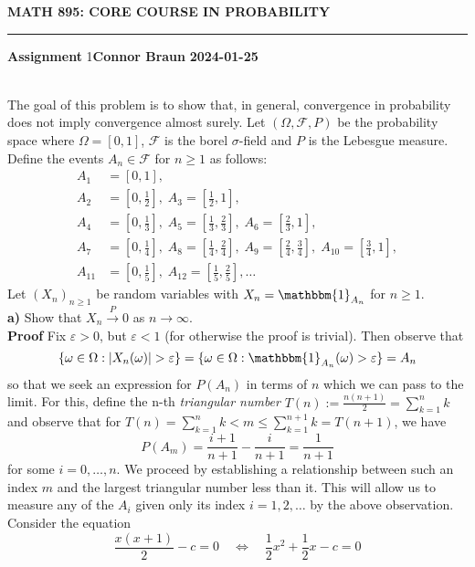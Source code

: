 \documentclass[10pt]{article}
\newcommand{\1}[1]{\mathbbm{1}_{#1}}
\begin{document}
    \begin{center}
        {\bf\large{MATH 895: CORE COURSE IN PROBABILITY}}
        \smallskip
        \hrule
        \smallskip
        {\bf Assignment} 1\hfill {\bf Connor Braun} \hfill {\bf 2024-01-25}
    \end{center}
    \\[5pt]
    The goal of this problem is to show that, in general, convergence in probability does not imply convergence almost surely. Let $(\Omega, \mathcal{F}, P)$ be the probability space where $\Omega=[0,1]$,
    $\mathcal{F}$ is the borel $\sigma$-field and $P$ is the Lebesgue measure. Define the events $A_n\in\mathcal{F}$ for $n\geq  1$ as follows:
    \begin{align*}
        A_1&=[0,1],\\
        A_2&=[0,\tfrac{1}{2}],\;A_3=[\tfrac{1}{2},1],\\
        A_4&=[0,\tfrac{1}{3}],\;A_5=[\tfrac{1}{3},\tfrac{2}{3}],\;A_6=[\tfrac{2}{3},1],\\
        A_7&=[0,\tfrac{1}{4}],\;A_8=[\tfrac{1}{4},\tfrac{2}{4}],\;A_9=[\tfrac{2}{4},\tfrac{3}{4}],\;A_{10}=[\tfrac{3}{4},1],\\
        A_{11}&=[0,\tfrac{1}{5}],\;A_{12}=[\tfrac{1}{5},\tfrac{2}{5}],\dots
    \end{align*}
    Let $(X_n)_{n\geq 1}$ be random variables with $X_n=\1{A_n}$ for $n\geq 1$.\\[5pt]
    {\bf a)} Show that $X_n\overset{P}{\longrightarrow} 0$ as $n\rightarrow\infty$.\\[5pt]
    {\bf Proof}\hspace{5pt} Fix $\varepsilon>0$, but $\varepsilon<1$ (for otherwise the proof is trivial). Then observe that
    \[\{\omega\in\Omega:|X_n(\omega)|>\varepsilon\}=\{\omega\in\Omega:\1{A_n}(\omega)>\varepsilon\}=A_n\]
    so that we seek an expression for $P(A_n)$ in terms of $n$ which we can pass to the limit. For this, define the n-th {\it triangular number} $T(n):=\frac{n(n+1)}{2}=\sum_{k=1}^nk$ and observe that for $T(n)=\sum_{k=1}^nk< m\leq \sum_{k=1}^{n+1}k=T(n+1)$, we have
    \[P(A_m)=\frac{i+1}{n+1}-\frac{i}{n+1}=\frac{1}{n+1}\]
    for some $i=0,\dots,n$. We proceed by establishing a relationship between such an index $m$ and the largest triangular number less than it. This will allow us to measure any of the $A_i$ given only its index $i=1,2,\dots$ by the above observation.\\[5pt]
    Consider the equation
    \[\frac{x(x+1)}{2}-c=0\quad\Leftrightarrow\quad \frac{1}{2}x^2+\frac{1}{2}x-c=0\tag{13}\]
\end{document}
